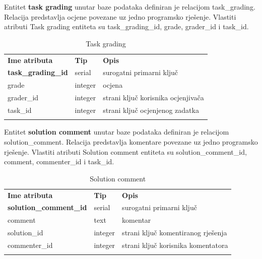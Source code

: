 \documentclass[times, utf8, zavrsni]{fer}
\begin{document}
		Entitet \textbf{task grading} unutar baze podataka definiran je relacijom task\_grading. Relacija predstavlja ocjene povezane uz jedno programsko rješenje. Vlastiti atributi Task grading entiteta su task\_grading\_id, grade, grader\_id i task\_id. 
		\begin{table}[H]
			\caption{Task grading}
			\label{tbl:taskgrading}
			\centering
			\begin{tabu} to \textwidth {XXX}
				\tabucline[1.75pt]{-}
				\textbf{Ime atributa} & \textbf{Tip} & \textbf{Opis}\\ 				
				\tabucline[1.75pt]{-}
				\textbf{task\_grading\_id} & serial & surogatni primarni ključ\\ \hline
				grade & integer & ocjena\\ \hline
				grader\_id & integer & strani ključ korisnika ocjenjivača\\ \hline
				task\_id & integer & strani ključ ocjenjenog zadatka\\ \hline
				\tabucline[1.75pt]{-}
			\end{tabu}
		\end{table}
	
		Entitet \textbf{solution comment} unutar baze podataka definiran je relacijom solution\_comment. Relacija predstavlja komentare povezane uz jedno programsko rješenje. Vlastiti atributi Solution comment entiteta su solution\_comment\_id, comment, commenter\_id i task\_id. 
		\begin{table}[H]
			\caption{Solution comment}
			\label{tbl:solutioncomment}
			\centering
			\begin{tabu} to \textwidth {XXX}
				\tabucline[1.75pt]{-}
				\textbf{Ime atributa} & \textbf{Tip} & \textbf{Opis}\\ 				
				\tabucline[1.75pt]{-}
				\textbf{solution\_comment\_id} & serial & surogatni primarni ključ\\ \hline
				comment & text & komentar\\ \hline
				solution\_id & integer & strani ključ komentiranog rješenja\\ \hline
				commenter\_id & integer & strani ključ korisnika komentatora\\ \hline
				\tabucline[1.75pt]{-}
			\end{tabu}
		\end{table}
	
\end{document}
